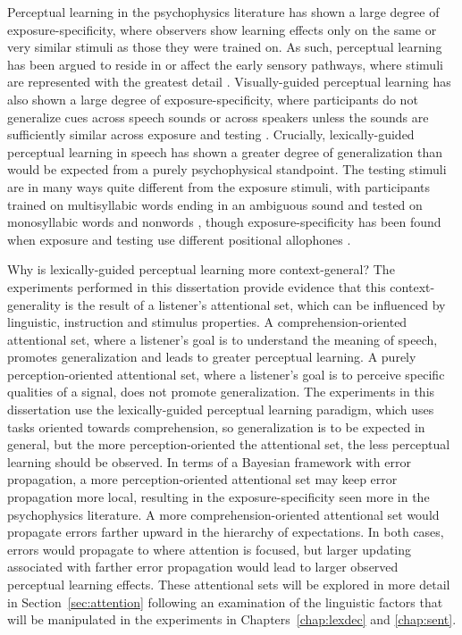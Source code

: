 Perceptual learning in the psychophysics literature has shown a large degree of exposure-specificity, where observers show learning effects only on the same or very similar stimuli as those they were trained on. 
As such, perceptual learning has been argued to reside in or affect the early sensory pathways, where stimuli are represented with the greatest detail \citep{Gilbert2001}.  
Visually-guided perceptual learning has also shown a large degree of exposure-specificity, where participants do not generalize cues across speech sounds \citep{Reinisch2014} or across speakers unless the sounds are sufficiently similar across exposure and testing \citep{Eisner2005, Kraljic2005, Kraljic2007, Reinisch2013a}.  
Crucially, lexically-guided perceptual learning in speech has shown a greater degree of generalization than would be expected from a purely psychophysical standpoint.  
The testing stimuli are in many ways quite different from the exposure stimuli, with participants trained on multisyllabic words ending in an ambiguous sound and tested on monosyllabic words \citep{Reinisch2013} and nonwords \citep{Norris2003, Kraljic2005}, though exposure-specificity has been found when exposure and testing use different positional allophones \citep{Mitterer2013}.

Why is lexically-guided perceptual learning more context-general?
The experiments performed in this dissertation provide evidence that this context-generality is the result of a listener's attentional set, which can be influenced by linguistic, instruction and stimulus properties.
A comprehension-oriented attentional set, where a listener's goal is to understand the meaning of speech, promotes generalization and leads to greater perceptual learning.  
A purely perception-oriented attentional set, where a listener's goal is to perceive specific qualities of a signal, does not promote generalization.
The experiments in this dissertation use the lexically-guided perceptual learning paradigm, which uses tasks oriented towards comprehension, so generalization is to be expected in general, but the more perception-oriented the attentional set, the less perceptual learning should be observed.
In terms of a Bayesian framework with error propagation, a more perception-oriented attentional set may keep error propagation more local, resulting in the exposure-specificity seen more in the psychophysics literature.
A more comprehension-oriented attentional set would propagate errors farther upward in the hierarchy of expectations.
In both cases, errors would propagate to where attention is focused, but larger updating associated with farther error propagation would lead to larger observed perceptual learning effects.
These attentional sets will be explored in more detail in Section~\ref{sec:attention} following an examination of the linguistic factors that will be manipulated in the experiments in Chapters~\ref{chap:lexdec} and \ref{chap:sent}.

